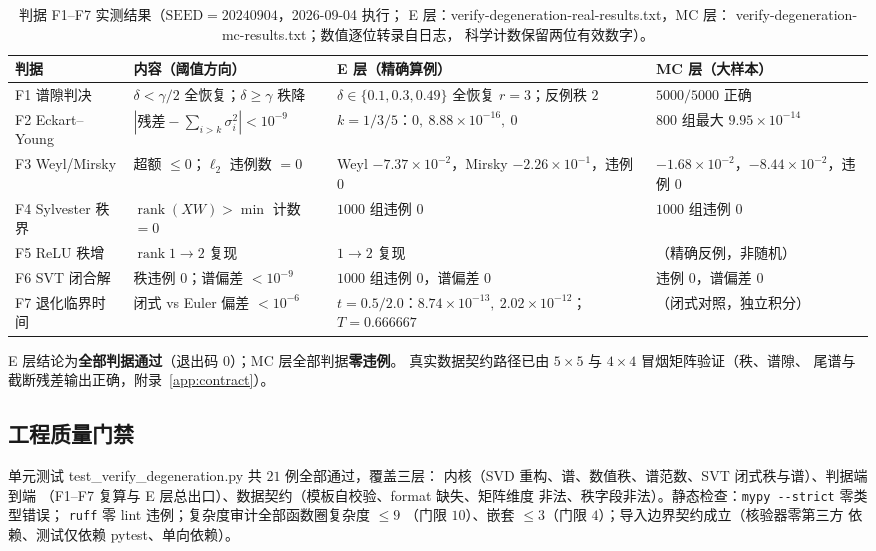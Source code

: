 \documentclass[UTF8,11pt,a4paper]{ctexart}
\theoremstyle{plain}
\theoremstyle{definition}
\theoremstyle{remark}
\newcommand{\rank}{\operatorname{rank}}
\begin{document}
\begin{table}[htbp]
\centering
\caption{判据 F1--F7 实测结果（$\mathrm{SEED}=20240904$，2026-09-04 执行；
E 层：\textsf{verify-degeneration-real-results.txt}，MC 层：
\textsf{verify-degeneration-mc-results.txt}；数值逐位转录自日志，
科学计数保留两位有效数字）。}
\label{tab:f}
\footnotesize
\begin{tabularx}{\textwidth}{@{}l>{\raggedright\arraybackslash}X
>{\raggedright\arraybackslash}X>{\raggedright\arraybackslash}X@{}}
\toprule
\textbf{判据} & \textbf{内容（阈值方向）} & \textbf{E 层（精确算例）} & \textbf{MC 层（大样本）}\\
\midrule
F1 谱隙判决 & $\delta<\gamma/2$ 全恢复；$\delta\ge\gamma$ 秩降 &
$\delta\in\{0.1,0.3,0.49\}$ 全恢复 $r{=}3$；反例秩 $2$ &
$5000/5000$ 正确\\
F2 Eckart--Young & $|\text{残差}-\textstyle\sum_{i>k}\sigma_i^2|<10^{-9}$ &
$k{=}1/3/5$：$0,\ 8.88\times10^{-16},\ 0$ &
$800$ 组最大 $9.95\times10^{-14}$\\
F3 Weyl/Mirsky & 超额 $\le0$；$\ell_2$ 违例数 $=0$ &
Weyl $-7.37\times10^{-2}$，Mirsky $-2.26\times10^{-1}$，违例 $0$ &
$-1.68\times10^{-2}$，$-8.44\times10^{-2}$，违例 $0$\\
F4 Sylvester 秩界 & $\rank(XW)>\min$ 计数 $=0$ &
$1000$ 组违例 $0$ & $1000$ 组违例 $0$\\
F5 ReLU 秩增 & $\rank 1\to2$ 复现 & $1\to2$ 复现 & （精确反例，非随机）\\
F6 SVT 闭合解 & 秩违例 $0$；谱偏差 $<10^{-9}$ &
$1000$ 组违例 $0$，谱偏差 $0$ & 违例 $0$，谱偏差 $0$\\
F7 退化临界时间 & 闭式 vs Euler 偏差 $<10^{-6}$ &
$t{=}0.5/2.0$：$8.74\times10^{-13},\ 2.02\times10^{-12}$；$T=0.666667$ &
（闭式对照，独立积分）\\
\bottomrule
\end{tabularx}
\normalsize
\end{table}

E 层结论为\textbf{全部判据通过}（退出码 $0$）；MC 层全部判据\textbf{零违例}。
真实数据契约路径已由 $5\times5$ 与 $4\times4$ 冒烟矩阵验证（秩、谱隙、
尾谱与截断残差输出正确，附录~\ref{app:contract}）。

\subsection{工程质量门禁}

单元测试 \textsf{test\_verify\_degeneration.py} 共 $21$ 例全部通过，覆盖三层：
内核（SVD 重构、谱、数值秩、谱范数、SVT 闭式秩与谱）、判据端到端
（F1--F7 复算与 E 层总出口）、数据契约（模板自校验、format 缺失、矩阵维度
非法、秩字段非法）。静态检查：\texttt{mypy -{}-strict} 零类型错误；
\texttt{ruff} 零 lint 违例；复杂度审计全部函数圈复杂度 $\le9$
（门限 $10$）、嵌套 $\le3$（门限 $4$）；导入边界契约成立（核验器零第三方
依赖、测试仅依赖 pytest、单向依赖）。
\end{document}
